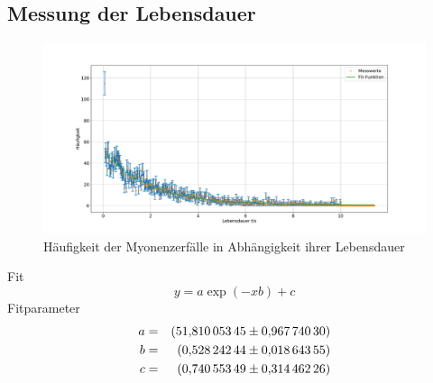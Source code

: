 \subsection{Messung der Lebensdauer}
\begin{figure}[h!]
  \centering
  \includegraphics[width=\textwidth]{figmyonen.pdf}
  \caption{Häufigkeit der Myonenzerfälle in Abhängigkeit ihrer Lebensdauer}
  \label{fig:myonen}
\end{figure}
Fit
\begin{equation*}
y = a \exp{(-x b)}+c
\end{equation*}
Fitparameter
\begin{align*}
a  &=&  \SI{51.81005345 \pm 0.9677403}{}\\
b  &=&  \SI{0.52824244 \pm 0.01864355}{}\\
c  &=&  \SI{0.74055349 \pm 0.31446226}{}\\
\end{align*}
\FloatBarrier
